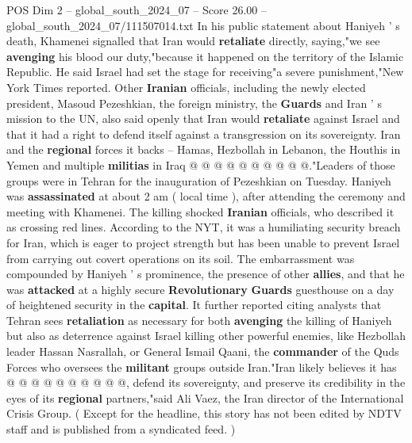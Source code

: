 \begin{textsample}{POS Dim 2 – global\_south\_2024\_07 – Score 26.00 – global\_south\_2024\_07/111507014.txt}
In his public statement about Haniyeh ' s death, Khamenei signalled that Iran would \textbf{retaliate} directly, saying,"we see \textbf{avenging} his blood our duty,"because it happened on the territory of the Islamic Republic.
He said Israel had set the stage for receiving"a severe punishment,"New York Times reported.
Other \textbf{Iranian} officials, including the newly elected president, Masoud Pezeshkian, the foreign ministry, the \textbf{Guards} and Iran ' s mission to the UN, also said openly that Iran would \textbf{retaliate} against Israel and that it had a right to defend itself against a transgression on its sovereignty.
Iran and the \textbf{regional} forces it backs -- Hamas, Hezbollah in Lebanon, the Houthis in Yemen and multiple \textbf{militias} in Iraq @ @ @ @ @ @ @ @ @ @."Leaders of those groups were in Tehran for the inauguration of Pezeshkian on Tuesday.
Haniyeh was \textbf{assassinated} at about 2 am ( local time ), after attending the ceremony and meeting with Khamenei.
The killing shocked \textbf{Iranian} officials, who described it as crossing red lines.
According to the NYT, it was a humiliating security breach for Iran, which is eager to project strength but has been unable to prevent Israel from carrying out covert operations on its soil.
The embarrassment was compounded by Haniyeh ' s prominence, the presence of other \textbf{allies}, and that he was \textbf{attacked} at a highly secure \textbf{Revolutionary} \textbf{Guards} guesthouse on a day of heightened security in the \textbf{capital}.
It further reported citing analysts that Tehran sees \textbf{retaliation} as necessary for both \textbf{avenging} the killing of Haniyeh but also as deterrence against Israel killing other powerful enemies, like Hezbollah leader Hassan Nasrallah, or General Ismail Qaani, the \textbf{commander} of the Quds Forces who oversees the \textbf{militant} groups outside Iran."Iran likely believes it has @ @ @ @ @ @ @ @ @ @, defend its sovereignty, and preserve its credibility in the eyes of its \textbf{regional} partners,"said Ali Vaez, the Iran director of the International Crisis Group. ( Except for the headline, this story has not been edited by NDTV staff and is published from a syndicated feed. )

\end{textsample}
